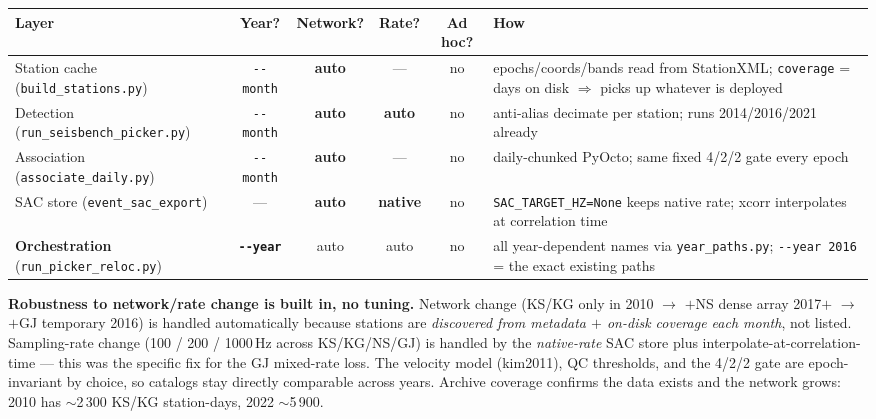 \documentclass[11pt]{article}
\begin{document}
\begin{center}
\small
\begin{tabular}{@{}>{\raggedright\arraybackslash}p{3.6cm}cccc>{\raggedright\arraybackslash}p{4.3cm}@{}}
\toprule
Layer & Year? & Network? & Rate? & Ad hoc? & How \\
\midrule
Station cache \newline (\texttt{build\_stations.py}) & \texttt{-{}-month} & \textbf{auto} & --- & no & epochs/coords/bands read from StationXML; \texttt{coverage} = days on disk $\Rightarrow$ picks up whatever is deployed \\
Detection \newline (\texttt{run\_seisbench\_picker.py}) & \texttt{-{}-month} & \textbf{auto} & \textbf{auto} & no & anti-alias decimate per station; runs 2014/2016/2021 already \\
Association \newline (\texttt{associate\_daily.py}) & \texttt{-{}-month} & \textbf{auto} & --- & no & daily-chunked PyOcto; same fixed 4/2/2 gate every epoch \\
SAC store \newline (\texttt{event\_sac\_export}) & --- & \textbf{auto} & \textbf{native} & no & \texttt{SAC\_TARGET\_HZ=None} keeps native rate; xcorr interpolates at correlation time \\
\textbf{Orchestration} \newline (\texttt{run\_picker\_reloc.py}) & \textbf{\texttt{-{}-year}} & auto & auto & no & all year-dependent names via \texttt{year\_paths.py}; \texttt{-{}-year 2016} = the exact existing paths \\
\bottomrule
\end{tabular}
\end{center}

\noindent\textbf{Robustness to network/rate change is built in, no tuning.} Network change (KS/KG only in 2010
$\rightarrow$ $+$NS dense array 2017$+$ $\rightarrow$ $+$GJ temporary 2016) is handled automatically because
stations are \emph{discovered from metadata $+$ on-disk coverage each month}, not listed. Sampling-rate change
(100 / 200 / 1000\,Hz across KS/KG/NS/GJ) is handled by the \emph{native-rate} SAC store plus
interpolate-at-correlation-time --- this was the specific fix for the GJ mixed-rate loss. The velocity model
(kim2011), QC thresholds, and the 4/2/2 gate are epoch-invariant by choice, so catalogs stay directly
comparable across years. Archive coverage confirms the data exists and the network grows: 2010 has
$\sim$2\,300 KS/KG station-days, 2022 $\sim$5\,900.
\end{document}
